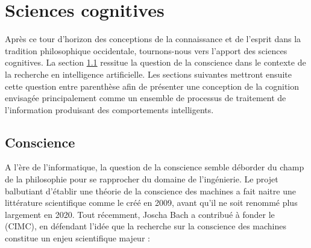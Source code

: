 \section{Sciences cognitives}

\noindent
Après ce tour d'horizon des conceptions de la connaissance et de l'esprit dans la tradition philosophique occidentale, tournons-nous vers l'apport des sciences cognitives. 
La section \ref{sec:conscience} ressitue la question de la conscience dans le contexte de la recherche en intelligence artificielle. 
Les sections suivantes mettront ensuite cette question entre parenthèse afin de présenter une conception de la cognition envisagée principalement comme un ensemble de processus de traitement de l’information produisant des comportements intelligents.


\subsection{Conscience}
\label{sec:conscience}

\noindent
A l'ère de l'informatique, la question de la conscience semble déborder du champ de la philosophie pour se rapprocher du domaine de l'ingénierie. 
Le projet balbutiant d'établir une théorie de la conscience des machines a fait naitre une littérature scientifique comme le  créé en 2009, avant qu'il ne soit renommé plus largement  en 2020. 
Tout récemment, Joscha Bach a contribué à fonder le  (CIMC), en défendant l'idée que la recherche sur la conscience des machines constitue un enjeu scientifique majeur :

